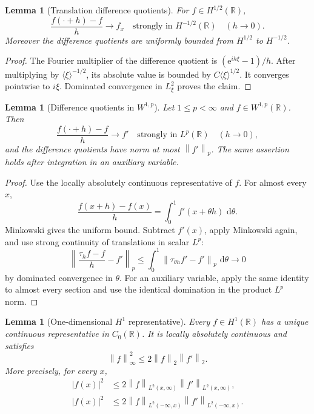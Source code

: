 \documentclass[11pt,oneside]{book}
\newtheorem{lemma}[theorem]{Lemma}
\theoremstyle{definition}
\theoremstyle{remark}
\newcommand{\R}{\mathbb R}
\newcommand{\1}{\mathbf 1}
\newcommand{\dd}{\,\mathrm d}
\newcommand{\norm}[1]{\left\lVert #1\right\rVert}
\newcommand{\e}{\mathrm e}
\begin{document}
\begin{lemma}[Translation difference quotients]\label{lem:translation-dq}
For $f\in H^{1/2}(\R)$,
\[
 \frac{f(\cdot+h)-f}{h}\longrightarrow f_x
 \quad\text{strongly in }H^{-1/2}(\R)
 \quad(h\to0).
\]
Moreover the difference quotients are uniformly bounded from
$H^{1/2}$ to $H^{-1/2}$.
\end{lemma}

\begin{proof}
The Fourier multiplier of the difference quotient is
$(\e^{ih\xi}-1)/h$.  After multiplying by $\langle\xi\rangle^{-1/2}$, its
absolute value is bounded by $C\langle\xi\rangle^{1/2}$.  It converges
pointwise to $i\xi$.  Dominated convergence in $L^2_\xi$ proves the claim.
\end{proof}

\begin{lemma}[Difference quotients in $W^{1,p}$]
\label{lem:Wp-difference-quotient}
Let $1\le p<\infty$ and $f\in W^{1,p}(\R)$.  Then
\begin{equation}
 \frac{f(\cdot+h)-f}{h}\longrightarrow f'
 \quad\text{strongly in }L^p(\R)\quad(h\to0),       \label{eq:Wp-difference-quotient}
\end{equation}
and the difference quotients have norm at most $\norm{f'}_p$.
The same assertion holds after integration in an auxiliary variable.
\end{lemma}

\begin{proof}
Use the locally absolutely continuous representative of $f$.  For almost
every $x$,
\[
 \frac{f(x+h)-f(x)}h=\int_0^1 f'(x+\theta h)\,\dd\theta.
\]
Minkowski gives the uniform bound.  Subtract $f'(x)$, apply Minkowski again,
and use strong continuity of translations in scalar $L^p$:
\[
 \left\|\frac{\tau_hf-f}{h}-f'\right\|_p
 \le\int_0^1\norm{\tau_{\theta h}f'-f'}_p\,\dd\theta\longrightarrow0
\]
by dominated convergence in $\theta$.  For an auxiliary variable, apply the
same identity to almost every section and use the identical domination in
the product $L^p$ norm.
\end{proof}

\begin{lemma}[One-dimensional $H^1$ representative]
\label{lem:H1-C0}
Every $f\in H^1(\R)$ has a unique continuous representative in $C_0(\R)$.
It is locally absolutely continuous and satisfies
\begin{equation}
 \norm f_\infty^2\le2\norm f_2\norm{f'}_2.          \label{eq:H1-Linfty}
\end{equation}
More precisely, for every $x$,
\begin{align}
 |f(x)|^2&\le2\norm f_{L^2(x,\infty)}\norm{f'}_{L^2(x,\infty)},\label{eq:H1-tail-plus}\\
 |f(x)|^2&\le2\norm f_{L^2(-\infty,x)}\norm{f'}_{L^2(-\infty,x)}.\label{eq:H1-tail-minus}
\end{align}
\end{lemma}
\end{document}
